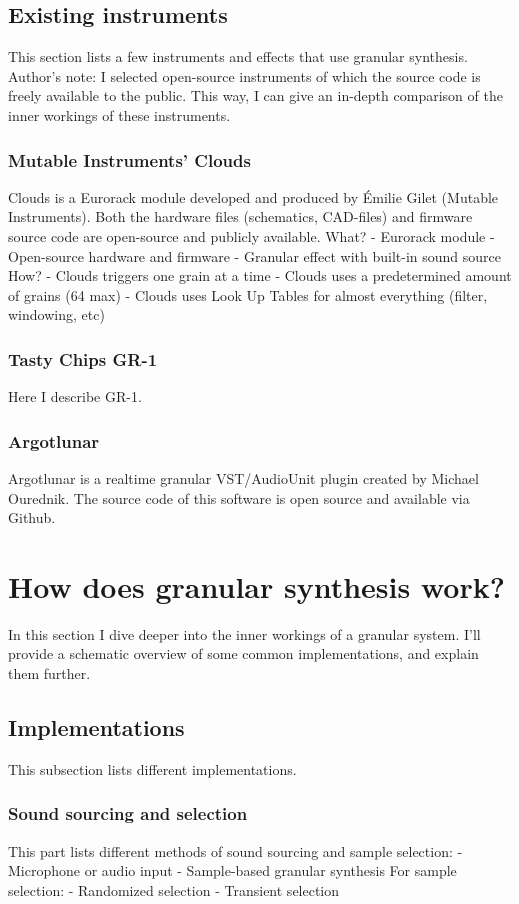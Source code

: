 \documentclass[10pt, twocolumn]{IEEEtran}
\begin{document}
\subsection{Existing instruments}
This section lists a few instruments and effects that use granular synthesis. Author's note: I selected open-source instruments of which the source code is freely available to the public. This way, I can give an in-depth comparison of the inner workings of these instruments.

\subsubsection{Mutable Instruments' Clouds}
Clouds is a Eurorack module developed and produced by Émilie Gilet (Mutable Instruments). Both the hardware files (schematics, CAD-files) and firmware source code are open-source and publicly available.
What?
- Eurorack module
- Open-source hardware and firmware
- Granular effect with built-in sound source
How?
- Clouds triggers one grain at a time
- Clouds uses a predetermined amount of grains (64 max)
- Clouds uses Look Up Tables for almost everything (filter, windowing, etc)

\subsubsection{Tasty Chips GR-1}
Here I describe GR-1.

\subsubsection{Argotlunar}
Argotlunar is a realtime granular VST/AudioUnit plugin created by Michael Ourednik. The source code of this software is open source and available via Github.


\section{How does granular synthesis work?}
In this section I dive deeper into the inner workings of a granular system. I'll provide a schematic overview of some common implementations, and explain them further.

\subsection{Implementations}
This subsection lists different implementations.
\subsubsection{Sound sourcing and selection}
This part lists different methods of sound sourcing and sample selection:
- Microphone or audio input
- Sample-based granular synthesis
For sample selection:
- Randomized selection
- Transient selection
\end{document}
